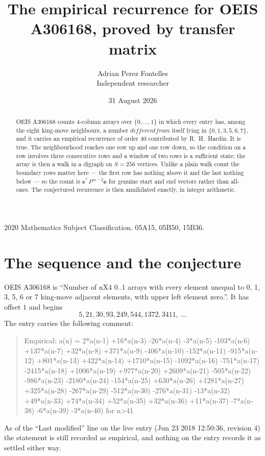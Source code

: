\documentclass[11pt,a4paper]{article}
\title{The empirical recurrence for OEIS A306168, proved by transfer matrix}
\author{Adrian Perez Fontelles\\ \small Independent researcher}
\date{31 August 2026}
\theoremstyle{plain}
\theoremstyle{definition}
\begin{document}
\maketitle

\begin{abstract}
OEIS A306168 counts $4$-column arrays over $\{0,\dots,1\}$ in which every entry has,
among the eight king-move neighbours, a number $different from$ itself lying in $\{0,1,3,5,6,7\}$, and it carries an empirical
recurrence of order $40$ contributed by R.~H.~Hardin. It is true. The neighbourhood
reaches one row up and one row down, so the condition on a row involves three consecutive
rows and a window of two rows is a sufficient state; the array is then a walk in a digraph
on $S=256$ vertices. Unlike a plain walk count the boundary rows matter here --- the first
row has nothing above it and the last nothing below --- so the count is
$\mathbf{s}^{\!\top}P^{\,n-2}\mathbf{e}$ for genuine start and end vectors rather than
all-ones. The conjectured recurrence is then annihilated exactly, in integer arithmetic.
\end{abstract}

\noindent\small 2020 Mathematics Subject Classification. 05A15, 05B50, 15B36.\normalsize

\section{The sequence and the conjecture}

OEIS A306168 is ``Number of nX4 0..1 arrays with every element unequal to 0, 1, 3, 5, 6 or 7 king-move adjacent elements, with upper left element zero.''. It has offset
$1$ and begins
\[
5, 21, 30, 93, 249, 544, 1372, 3411,\ \dots
\]
The entry carries the following comment:
\begin{quote}\small
Empirical: a(n) = 2*a(n-1) +16*a(n-3) -26*a(n-4) -3*a(n-5) -103*a(n-6) +137*a(n-7) +32*a(n-8) +371*a(n-9) -406*a(n-10) -152*a(n-11) -915*a(n-12) +801*a(n-13) +422*a(n-14) +1710*a(n-15) -1092*a(n-16) -751*a(n-17) -2415*a(n-18) +1006*a(n-19) +977*a(n-20) +2609*a(n-21) -505*a(n-22) -986*a(n-23) -2180*a(n-24) -154*a(n-25) +630*a(n-26) +1281*a(n-27) +325*a(n-28) -267*a(n-29) -512*a(n-30) -276*a(n-31) -13*a(n-32) +49*a(n-33) +74*a(n-34) +52*a(n-35) +32*a(n-36) +11*a(n-37) -7*a(n-38) -6*a(n-39) -3*a(n-40) for n>41
\end{quote}
As of the ``Last modified'' line on the live entry (Jun 23 2018 12:50:36, revision
4) the statement is still recorded as empirical, and nothing on the entry
records it as settled either way.
\end{document}

